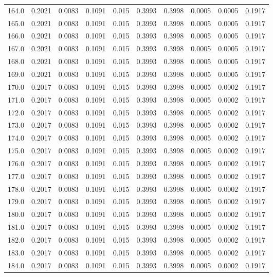 \begin{longtable}{lrrrrrrrrr}
164.0 & 0.2021 & 0.0083 & 0.1091 & 0.015 & 0.3993 & 0.3998 & 0.0005 & 0.0005 & 0.1917 \\
165.0 & 0.2021 & 0.0083 & 0.1091 & 0.015 & 0.3993 & 0.3998 & 0.0005 & 0.0005 & 0.1917 \\
166.0 & 0.2021 & 0.0083 & 0.1091 & 0.015 & 0.3993 & 0.3998 & 0.0005 & 0.0005 & 0.1917 \\
167.0 & 0.2021 & 0.0083 & 0.1091 & 0.015 & 0.3993 & 0.3998 & 0.0005 & 0.0005 & 0.1917 \\
168.0 & 0.2021 & 0.0083 & 0.1091 & 0.015 & 0.3993 & 0.3998 & 0.0005 & 0.0005 & 0.1917 \\
169.0 & 0.2021 & 0.0083 & 0.1091 & 0.015 & 0.3993 & 0.3998 & 0.0005 & 0.0005 & 0.1917 \\
170.0 & 0.2017 & 0.0083 & 0.1091 & 0.015 & 0.3993 & 0.3998 & 0.0005 & 0.0002 & 0.1917 \\
171.0 & 0.2017 & 0.0083 & 0.1091 & 0.015 & 0.3993 & 0.3998 & 0.0005 & 0.0002 & 0.1917 \\
172.0 & 0.2017 & 0.0083 & 0.1091 & 0.015 & 0.3993 & 0.3998 & 0.0005 & 0.0002 & 0.1917 \\
173.0 & 0.2017 & 0.0083 & 0.1091 & 0.015 & 0.3993 & 0.3998 & 0.0005 & 0.0002 & 0.1917 \\
174.0 & 0.2017 & 0.0083 & 0.1091 & 0.015 & 0.3993 & 0.3998 & 0.0005 & 0.0002 & 0.1917 \\
175.0 & 0.2017 & 0.0083 & 0.1091 & 0.015 & 0.3993 & 0.3998 & 0.0005 & 0.0002 & 0.1917 \\
176.0 & 0.2017 & 0.0083 & 0.1091 & 0.015 & 0.3993 & 0.3998 & 0.0005 & 0.0002 & 0.1917 \\
177.0 & 0.2017 & 0.0083 & 0.1091 & 0.015 & 0.3993 & 0.3998 & 0.0005 & 0.0002 & 0.1917 \\
178.0 & 0.2017 & 0.0083 & 0.1091 & 0.015 & 0.3993 & 0.3998 & 0.0005 & 0.0002 & 0.1917 \\
179.0 & 0.2017 & 0.0083 & 0.1091 & 0.015 & 0.3993 & 0.3998 & 0.0005 & 0.0002 & 0.1917 \\
180.0 & 0.2017 & 0.0083 & 0.1091 & 0.015 & 0.3993 & 0.3998 & 0.0005 & 0.0002 & 0.1917 \\
181.0 & 0.2017 & 0.0083 & 0.1091 & 0.015 & 0.3993 & 0.3998 & 0.0005 & 0.0002 & 0.1917 \\
182.0 & 0.2017 & 0.0083 & 0.1091 & 0.015 & 0.3993 & 0.3998 & 0.0005 & 0.0002 & 0.1917 \\
183.0 & 0.2017 & 0.0083 & 0.1091 & 0.015 & 0.3993 & 0.3998 & 0.0005 & 0.0002 & 0.1917 \\
184.0 & 0.2017 & 0.0083 & 0.1091 & 0.015 & 0.3993 & 0.3998 & 0.0005 & 0.0002 & 0.1917 \\

\end{longtable}
